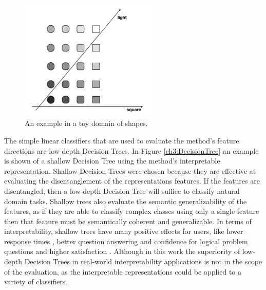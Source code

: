 



\begin{figure}[t]
	\includegraphics[width=250px]{images/toy_domain.png}
		\centering
	\caption{An example in a toy domain of shapes.}\label{ch3:ToyDirectionsGraphic}
\end{figure}

The simple linear classifiers that are used to evaluate the method's feature directions are low-depth Decision Trees. In Figure \ref{ch3:DecisionTree} an example is shown of a shallow Decision Tree using the method's interpretable representation. Shallow Decision Trees were chosen because they are effective at evaluating the disentanglement of the representations features. If the features are disentangled, then a low-depth Decision Tree will suffice to classify natural domain tasks. Shallow trees also evaluate the semantic generalizability of the features, as if they are able to classify complex classes using only a single feature then that feature must be semantically coherent and generalizable. In terms of interpretability, shallow trees have many positive effects for users, like lower response times \cite{Narayanan2018, Huysmans2011}, better question answering and confidence for logical problem questions \cite{Huysmans2011} and higher satisfaction \cite{Narayanan2018}. Although in this work  the superiority of  low-depth Decision Trees in real-world interpretability applications is not in the scope of the evaluation, as the interpretable representations  could be applied to a variety of classifiers.

